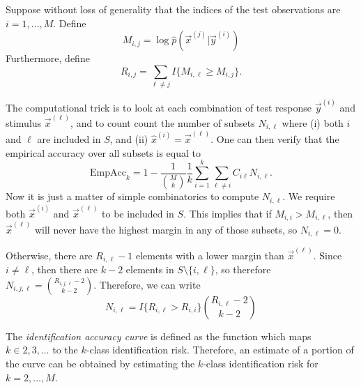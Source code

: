 Suppose without loss of generality that the indices of the test observations are $i = 1,\hdots, M$.
Define
\[
M_{i,j} = \log \hat{p}(\vec{x}^{(j)}|\vec{y}^{(i)})
\]
Furthermore, define
\[
R_{i,j} = \sum_{\ell \neq j} I\{M_{i,\ell} \geq M_{i, j}\}.
\]

The computational trick is to look at each combination of test
response $\vec{y}^{(i)}$ and stimulus $\vec{x}^{(\ell)}$, and to count
count the number of subsets $N_{i, \ell}$ where (i) both $i$ and
$\ell$ are included in $S$, and (ii) $\hat{x}^{(i)} = \vec{x}^{(\ell)}$.
One can then verify that the empirical accuracy over all subsets is
equal to
\begin{equation}\label{eq:avtestrisk}
\text{EmpAcc}_k = 1 - \frac{1}{{{M}\choose{k}}}\frac{1}{k} \sum_{i=1}^{k} \sum_{\ell\neq i} C_{i\ell}N_{i, \ell}.
\end{equation}
Now it is just a matter of simple combinatorics to compute
$N_{i,\ell}$.  We require both $\vec{x}^{(i)}$ and $\vec{x}^{(\ell)}$ to be
included in $S$.  This implies that if $M_{i,i} > M_{i,\ell}$,
then $\vec{x}^{(\ell)}$ will never have the highest margin in any of those
subsets, so $N_{i,\ell} = 0$.

Otherwise, there are $R_{i,\ell} - 1$ elements
with a lower margin than $\vec{x}^{(\ell)}$.  Since $i \neq \ell$, then there
are $k-2$ elements in $S \setminus \{i, \ell\}$, so therefore $N_{i,
j, \ell} = {{R_{i,j,\ell} - 2}\choose{k - 2}}$.  Therefore, we can write
\begin{equation}\label{eq:avtestrisk_nil}
N_{i,\ell} = I\{R_{i,\ell} > R_{i,i}\}{{R_{i,\ell} -2}\choose{k - 2}}
\end{equation}

The \emph{identification accuracy curve} is defined as the function which maps $k \in 2,3,\hdots$ to the $k$-class identification risk.  Therefore, an estimate of a portion of the curve can be obtained by estimating the $k$-class identification risk for $k = 2,\hdots, M$.
